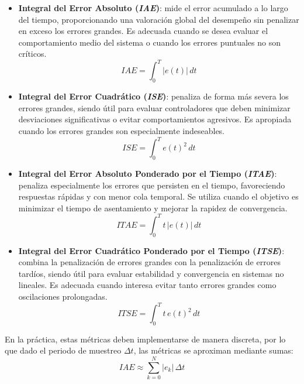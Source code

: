 \begin{itemize}
    \item \textbf{Integral del Error Absoluto (\textit{IAE})}: mide el error acumulado a lo largo del tiempo, 
    proporcionando una valoración global del desempeño sin penalizar en exceso los errores grandes. 
    Es adecuada cuando se desea evaluar el comportamiento medio del sistema o cuando los errores 
    puntuales no son críticos.
    \begin{equation}
        \mathrm{\textit{IAE}} = \int_0^T |e(t)| \, dt
    \end{equation}

    \item \textbf{Integral del Error Cuadrático (\textit{ISE})}: penaliza de forma más severa los errores grandes, 
    siendo útil para evaluar controladores que deben minimizar desviaciones significativas o evitar 
    comportamientos agresivos. Es apropiada cuando los errores grandes son especialmente indeseables.
    \begin{equation}
        \mathrm{\textit{ISE}} = \int_0^T e(t)^2 \, dt
    \end{equation}

    \item \textbf{Integral del Error Absoluto Ponderado por el Tiempo (\textit{ITAE})}: penaliza especialmente 
    los errores que persisten en el tiempo, favoreciendo respuestas rápidas y con menor cola temporal. 
    Se utiliza cuando el objetivo es minimizar el tiempo de asentamiento y mejorar la rapidez de convergencia.
    \begin{equation}
        \mathrm{\textit{ITAE}} = \int_0^T t \, |e(t)| \, dt
    \end{equation}

    \item \textbf{Integral del Error Cuadrático Ponderado por el Tiempo (\textit{ITSE})}: combina la penalización 
    de errores grandes con la penalización de errores tardíos, siendo útil para evaluar estabilidad y 
    convergencia en sistemas no lineales. Es adecuada cuando interesa evitar tanto errores grandes como 
    oscilaciones prolongadas.
    \begin{equation}
        \mathrm{\textit{ITSE}} = \int_0^T t \, e(t)^2 \, dt
    \end{equation}

\end{itemize}


En la práctica, estas métricas deben implementarse de manera discreta,
por lo que dado el periodo de muestreo $\Delta t$, las métricas se aproximan mediante sumas:
\begin{equation}
    \mathrm{\textit{IAE}} \approx \sum_{k=0}^{N} |e_k| \, \Delta t
\end{equation}

